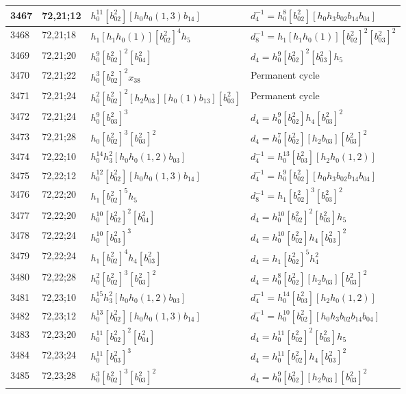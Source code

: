 \documentclass{article}
\begin{document}
\begin{longtable}{|l|l|>{\raggedright\arraybackslash}p{6cm}|>{\raggedright\arraybackslash}p{6cm}|}
\hline
3467 & 72,21;12 & $h_0^{11}[b_{02}^2][h_0h_0(1, 3)b_{14}]$ & $d_{4}^{-1}=h_0^8[b_{02}^2][h_0h_3b_{02}b_{14}b_{04}]$\\
\hline
3468 & 72,21;18 & $h_1[h_1h_0(1)][b_{02}^2]^4h_5$ & $d_{8}^{-1}=h_1[h_1h_0(1)][b_{02}^2]^2[b_{03}^2]^2$\\
\hline
3469 & 72,21;20 & $h_0^9[b_{02}^2]^2[b_{04}^2]$ &$d_{4}=h_0^9[b_{02}^2]^2[b_{03}^2]h_5$\\
\hline
3470 & 72,21;22 & $h_0^3[b_{02}^2]^2x_{38}$ & Permanent cycle\\
\hline
3471 & 72,21;24 & $h_0^2[b_{02}^2]^2[h_2b_{03}][h_0(1)b_{13}][b_{03}^2]$ & Permanent cycle\\
3472 & 72,21;24 & $h_0^9[b_{03}^2]^3$ &$d_{4}=h_0^9[b_{02}^2]h_4[b_{03}^2]^2$\\
\hline
3473 & 72,21;28 & $h_0[b_{02}^2]^3[b_{03}^2]^2$ &$d_{4}=h_0^7[b_{02}^2][h_2b_{03}][b_{03}^2]^2$\\
\hline
3474 & 72,22;10 & $h_0^{14}h_3^2[h_0h_0(1, 2)b_{03}]$ & $d_{4}^{-1}=h_0^{13}[b_{03}^2][h_2h_0(1, 2)]$\\
\hline
3475 & 72,22;12 & $h_0^{12}[b_{02}^2][h_0h_0(1, 3)b_{14}]$ & $d_{4}^{-1}=h_0^9[b_{02}^2][h_0h_3b_{02}b_{14}b_{04}]$\\
\hline
3476 & 72,22;20 & $h_1[b_{02}^2]^5h_5$ & $d_{8}^{-1}=h_1[b_{02}^2]^3[b_{03}^2]^2$\\
3477 & 72,22;20 & $h_0^{10}[b_{02}^2]^2[b_{04}^2]$ &$d_{4}=h_0^{10}[b_{02}^2]^2[b_{03}^2]h_5$\\
\hline
3478 & 72,22;24 & $h_0^{10}[b_{03}^2]^3$ &$d_{4}=h_0^{10}[b_{02}^2]h_4[b_{03}^2]^2$\\
3479 & 72,22;24 & $h_1[b_{02}^2]^4h_4[b_{03}^2]$ &$d_{4}=h_1[b_{02}^2]^5h_4^2$\\
\hline
3480 & 72,22;28 & $h_0^2[b_{02}^2]^3[b_{03}^2]^2$ &$d_{4}=h_0^8[b_{02}^2][h_2b_{03}][b_{03}^2]^2$\\
\hline
3481 & 72,23;10 & $h_0^{15}h_3^2[h_0h_0(1, 2)b_{03}]$ & $d_{4}^{-1}=h_0^{14}[b_{03}^2][h_2h_0(1, 2)]$\\
\hline
3482 & 72,23;12 & $h_0^{13}[b_{02}^2][h_0h_0(1, 3)b_{14}]$ & $d_{4}^{-1}=h_0^{10}[b_{02}^2][h_0h_3b_{02}b_{14}b_{04}]$\\
\hline
3483 & 72,23;20 & $h_0^{11}[b_{02}^2]^2[b_{04}^2]$ &$d_{4}=h_0^{11}[b_{02}^2]^2[b_{03}^2]h_5$\\
\hline
3484 & 72,23;24 & $h_0^{11}[b_{03}^2]^3$ &$d_{4}=h_0^{11}[b_{02}^2]h_4[b_{03}^2]^2$\\
\hline
3485 & 72,23;28 & $h_0^3[b_{02}^2]^3[b_{03}^2]^2$ &$d_{4}=h_0^9[b_{02}^2][h_2b_{03}][b_{03}^2]^2$\\

\end{longtable}
\end{document}
